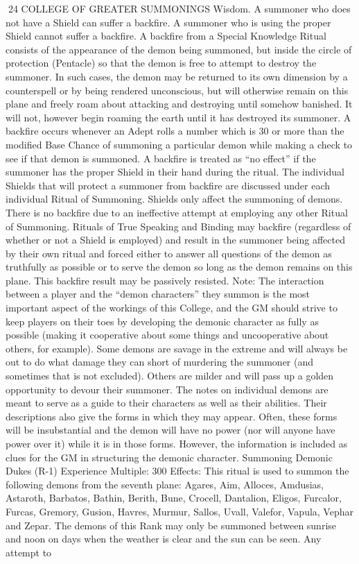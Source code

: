 \documentclass[a4paper]{article}
\begin{document}
\begin{multicols}{3}
24 COLLEGE OF GREATER SUMMONINGS
Wisdom. A summoner who does not have a Shield
can suffer a backfire. A summoner who is using the
proper Shield cannot suffer a backfire. A backfire
from a Special Knowledge Ritual consists of the
appearance of the demon being summoned, but
inside the circle of protection (Pentacle) so that the
demon is free to attempt to destroy the summoner.
In such cases, the demon may be returned to its
own dimension by a counterspell or by being rendered unconscious, but will otherwise remain on
this plane and freely roam about attacking and
destroying until somehow banished. It will not,
however begin roaming the earth until it has destroyed its summoner. A backfire occurs whenever
an Adept rolls a number which is 30 or more than
the modified Base Chance of summoning a particular demon while making a check to see if that
demon is summoned. A backfire is treated as “no
effect” if the summoner has the proper Shield in
their hand during the ritual.
The individual Shields that will protect a summoner from backfire are discussed under each
individual Ritual of Summoning. Shields only
affect the summoning of demons. There is no backfire due to an ineffective attempt at employing any
other Ritual of Summoning. Rituals of True Speaking and Binding may backfire (regardless of
whether or not a Shield is employed) and result in
the summoner being affected by their own ritual
and forced either to answer all questions of the
demon as truthfully as possible or to serve the
demon so long as the demon remains on this plane.
This backfire result may be passively resisted.
Note: The interaction between a player and the
“demon characters” they summon is the most important aspect of the workings of this College, and
the GM should strive to keep players on their toes
by developing the demonic character as fully as
possible (making it cooperative about some things
and uncooperative about others, for example).
Some demons are savage in the extreme and will
always be out to do what damage they can short of
murdering the summoner (and sometimes that is
not excluded). Others are milder and will pass up a
golden opportunity to devour their summoner. The
notes on individual demons are meant to serve as a
guide to their characters as well as their abilities.
Their descriptions also give the forms in which
they may appear. Often, these forms will be insubstantial and the demon will have no power (nor
will anyone have power over it) while it is in those
forms. However, the information is included as
clues for the GM in structuring the demonic character.
Summoning Demonic Dukes (R-1)
Experience Multiple: 300
Effects: This ritual is used to summon the following demons from the seventh plane: Agares, Aim,
Alloces, Amdusias, Astaroth, Barbatos, Bathin,
Berith, Bune, Crocell, Dantalion, Eligos, Furcalor,
Furcas, Gremory, Gusion, Havres, Murmur, Sallos,
Uvall, Valefor, Vapula, Vephar and Zepar. The
demons of this Rank may only be summoned between sunrise and noon on days when the weather
is clear and the sun can be seen. Any attempt to


\end{multicols}
\end{document}
